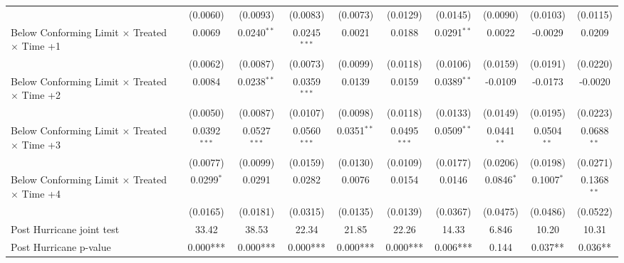 \begin{tabular}{lccccccccc}
                                                              & (0.0060)       & (0.0093)       & (0.0083)       & (0.0073)      & (0.0129)       & (0.0145)      & (0.0090)      & (0.0103)      & (0.0115)\\   
   Below Conforming Limit $\times$ Treated $\times$ Time +1   & 0.0069         & 0.0240$^{**}$  & 0.0245$^{***}$ & 0.0021        & 0.0188         & 0.0291$^{**}$ & 0.0022        & -0.0029       & 0.0209\\   
                                                              & (0.0062)       & (0.0087)       & (0.0073)       & (0.0099)      & (0.0118)       & (0.0106)      & (0.0159)      & (0.0191)      & (0.0220)\\   
   Below Conforming Limit $\times$ Treated $\times$ Time +2   & 0.0084         & 0.0238$^{**}$  & 0.0359$^{***}$ & 0.0139        & 0.0159         & 0.0389$^{**}$ & -0.0109       & -0.0173       & -0.0020\\   
                                                              & (0.0050)       & (0.0087)       & (0.0107)       & (0.0098)      & (0.0118)       & (0.0133)      & (0.0149)      & (0.0195)      & (0.0223)\\   
   Below Conforming Limit $\times$ Treated $\times$ Time +3   & 0.0392$^{***}$ & 0.0527$^{***}$ & 0.0560$^{***}$ & 0.0351$^{**}$ & 0.0495$^{***}$ & 0.0509$^{**}$ & 0.0441$^{**}$ & 0.0504$^{**}$ & 0.0688$^{**}$\\   
                                                              & (0.0077)       & (0.0099)       & (0.0159)       & (0.0130)      & (0.0109)       & (0.0177)      & (0.0206)      & (0.0198)      & (0.0271)\\   
   Below Conforming Limit $\times$ Treated $\times$ Time +4   & 0.0299$^{*}$   & 0.0291         & 0.0282         & 0.0076        & 0.0154         & 0.0146        & 0.0846$^{*}$  & 0.1007$^{*}$  & 0.1368$^{**}$\\   
                                                              & (0.0165)       & (0.0181)       & (0.0315)       & (0.0135)      & (0.0139)       & (0.0367)      & (0.0475)      & (0.0486)      & (0.0522)\\   
   Post Hurricane joint test                                  & 33.42          & 38.53          & 22.34          & 21.85         & 22.26          & 14.33         & 6.846         & 10.20         & 10.31\\  
   Post Hurricane p-value                                     & 0.000***       & 0.000***       & 0.000***       & 0.000***      & 0.000***       & 0.006***      & 0.144         & 0.037**       & 0.036**\\  

\end{tabular}
